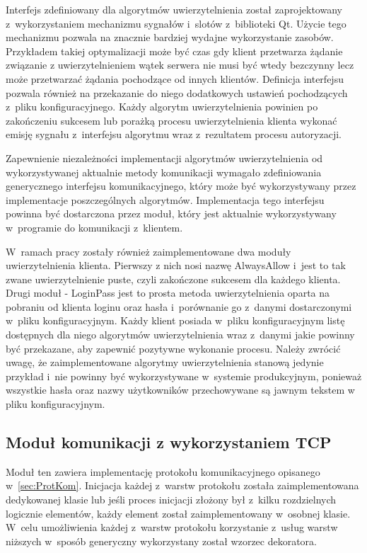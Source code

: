 Interfejs zdefiniowany dla algorytmów uwierzytelnienia został
zaprojektowany z~wykorzystaniem mechanizmu sygnałów i~slotów
z~biblioteki Qt. Użycie tego mechanizmu pozwala na znacznie bardziej
wydajne wykorzystanie zasobów. Przykładem takiej optymalizacji może być
czas gdy klient przetwarza żądanie związanie z uwierzytelnieniem wątek
serwera nie musi być wtedy bezczynny lecz może przetwarzać żądania
pochodzące od innych klientów. Definicja interfejsu pozwala również na
przekazanie do niego dodatkowych ustawień pochodzących z~pliku
konfiguracyjnego. Każdy algorytm uwierzytelnienia powinien po
zakończeniu sukcesem lub porażką procesu uwierzytelnienia klienta
wykonać emisję sygnału z~interfejsu algorytmu wraz z~rezultatem
procesu autoryzacji.

Zapewnienie niezależności implementacji algorytmów uwierzytelnienia od
wykorzystywanej aktualnie metody komunikacji wymagało zdefiniowania
generycznego interfejsu komunikacyjnego, który może być wykorzystywany
przez implementacje poszczególnych algorytmów. Implementacja tego
interfejsu powinna być dostarczona przez moduł, który jest aktualnie
wykorzystywany w~programie do komunikacji z~klientem.

W~ramach pracy zostały również zaimplementowane dwa moduły
uwierzytelnienia klienta. Pierwszy z nich nosi nazwę AlwaysAllow
i~jest to tak zwane uwierzytelnienie puste, czyli zakończone sukcesem
dla każdego klienta. Drugi moduł - LoginPass jest to prosta metoda
uwierzytelnienia oparta na pobraniu od klienta loginu oraz hasła
i~porównanie go z~danymi dostarczonymi w~pliku konfiguracyjnym. Każdy
klient posiada w~pliku konfiguracyjnym listę dostępnych dla niego
algorytmów uwierzytelnienia wraz z~danymi jakie powinny być
przekazane, aby zapewnić pozytywne wykonanie procesu. Należy zwrócić
uwagę, że zaimplementowane algorytmy uwierzytelnienia stanową jedynie
przykład i~nie powinny być wykorzystywane w~systemie produkcyjnym,
ponieważ wszystkie hasła oraz nazwy użytkowników przechowywane są
jawnym tekstem w pliku konfiguracyjnym.

\subsection[Moduł TCP][Moduł komunikacji z wykorzystaniem TCP]{Moduł komunikacji z wykorzystaniem TCP}

Moduł ten zawiera implementację protokołu komunikacyjnego opisanego
w~\ref{sec:ProtKom}. Inicjacja każdej z~warstw protokołu została
zaimplementowana dedykowanej klasie lub jeśli proces inicjacji złożony
był z~kilku rozdzielnych logicznie elementów, każdy element został
zaimplementowany w~osobnej klasie. W~celu umożliwienia każdej z~warstw
protokołu korzystanie z~usług warstw niższych w~sposób generyczny
wykorzystany został wzorzec dekoratora.

